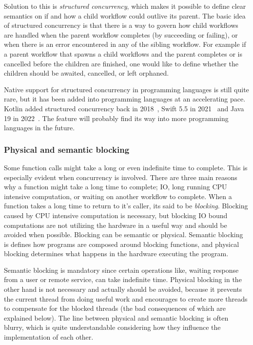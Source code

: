 Solution to this is \textit{structured concurrency}, which makes it possible to define clear semantics on if and how a child workflow could outlive its parent. The basic idea of structured concurrency is that there is a way to govern how child workflows are handled when the parent workflow completes (by succeeding or failing), or when there is an error encountered in any of the sibling workflow. For example if a parent workflow that spawns a child workflows and the parent completes or is cancelled before the children are finished, one would like to define whether the children should be awaited, cancelled, or left orphaned.

Native support for structured concurrency in programming languages is still quite rare, but it has been added into programming languages at an accelerating pace. Kotlin added structured concurrency back in 2018~\cite{kotlin-sc}, Swift 5.5 in 2021~\cite{swift-sc} and Java 19 in 2022~\cite{java-sc}. The feature will probably find its way into more programming languages in the future.


\subsubsection{Physical and semantic blocking}
Some function calls might take a long or even indefinite time to complete. This is especially evident when concurrency is involved. There are three main reasons why a function might take a long time to complete; IO, long running CPU intensive computation, or waiting on another workflow to complete. When a function takes a long time to return to it's caller, its said to be \textit{blocking}. Blocking caused by CPU intensive computation is necessary, but blocking IO bound computations are not utilizing the hardware in a useful way and should be avoided when possible. Blocking can be semantic or physical. Semantic blocking is defines how programs are composed around blocking functions, and physical blocking determines what happens in the hardware executing the program.

Semantic blocking is mandatory since certain operations like, waiting response from a user or remote service, can take indefinite time. Physical blocking in the other hand is not necessary and actually should be avoided, because it prevents the current thread from doing useful work and encourages to create more threads to compensate for the blocked threads (the bad consequences of which are explained below). The line between physical and semantic blocking is often blurry, which is quite understandable considering how they influence the implementation of each other.

